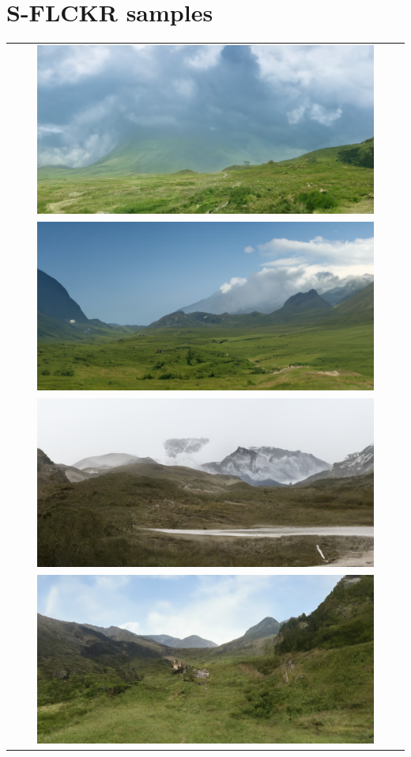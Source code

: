 \section{S-FLCKR samples}

\begin{longtable}{c} \label{tab:a2}
    \includegraphics[width=0.87\textwidth]{Chapters/figures/appendix/flickr/21_uncond_sample.png} \\
    \includegraphics[width=0.87\textwidth]{Chapters/figures/appendix/flickr/20_uncond_sample.png} \\
    \includegraphics[width=0.87\textwidth]{Chapters/figures/appendix/flickr/5_uncond_sample.png} \\
    \includegraphics[width=0.87\textwidth]{Chapters/figures/appendix/flickr/0_uncond_sample.png} \\

\end{longtable}

